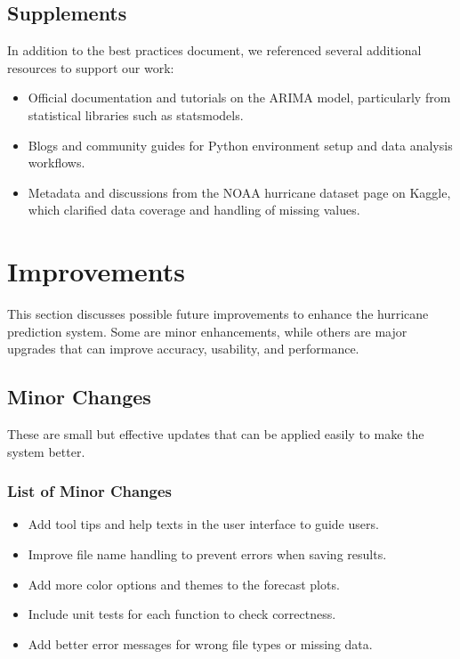 \section{Supplements}
In addition to the best practices document, we referenced several additional resources to support our work:
\begin{itemize}
	\item Official documentation and tutorials on the ARIMA model, particularly from statistical libraries such as statsmodels.
	\item Blogs and community guides for Python environment setup and data analysis workflows.
	\item Metadata and discussions from the NOAA hurricane dataset page on Kaggle, which clarified data coverage and handling of missing values.
\end{itemize}

\chapter{Improvements}

This section discusses possible future improvements to enhance the hurricane prediction system. Some are minor enhancements, while others are major upgrades that can improve accuracy, usability, and performance.

\section{Minor Changes}

These are small but effective updates that can be applied easily to make the system better.

\subsection{List of Minor Changes}
\begin{itemize}
	\item Add tool tips and help texts in the user interface to guide users.
	\item Improve file name handling to prevent errors when saving results.
	\item Add more color options and themes to the forecast plots.
	\item Include unit tests for each function to check correctness.
	\item Add better error messages for wrong file types or missing data.
\end{itemize}

